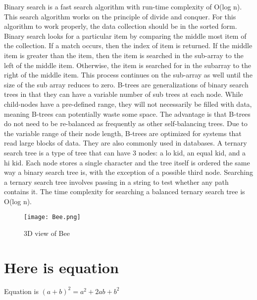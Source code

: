 \documentclass{article}
\begin{document}
\begin{}
Binary search is a fast search algorithm with run-time
complexity of Ο(log n). This search algorithm works
on the principle of divide and conquer. For this
algorithm to work properly, the data collection should
be in the sorted form.
Binary search looks for a particular item by
comparing the middle most item of the collection. If a
match occurs, then the index of item is returned. If the
middle item is greater than the item, then the item is
searched in the sub-array to the left of the middle
item. Otherwise, the item is searched for in the subarray to the right of the middle item. This process
continues on the sub-array as well until the size of the
sub array reduces to zero. B-trees are generalizations
of binary search trees in that they can have a variable
number of sub trees at each node. While child-nodes
have a pre-defined range, they will not necessarily be
filled with data, meaning B-trees can potentially waste
some space. The advantage is that B-trees do not need
to be re-balanced as frequently as other self-balancing
trees.
Due to the variable range of their node length, B-trees
are optimized for systems that read large blocks of
data. They are also commonly used in databases. A
ternary search tree is a type of tree that can have 3
nodes: a lo kid, an equal kid, and a hi kid. Each node
stores a single character and the tree itself is ordered
the same way a binary search tree is, with the
exception of a possible third node. Searching a ternary
search tree involves passing in a string to test whether
any path contains it. The time complexity for
searching a balanced ternary search tree is O(log n).
\begin{figure}
    \centering
    \texttt{[image: Bee.png]}
    \caption{3D view of Bee}
    \label{fig:my_label}
\end{figure}
\section{Here is equation}
Equation is $(a+b)^2=a^2+2ab+b^2$

\end{}
\end{document}
